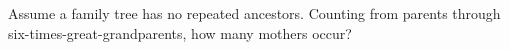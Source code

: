 Assume a family tree has no repeated ancestors. Counting from parents through six-times-great-grandparents, how many mothers occur?
